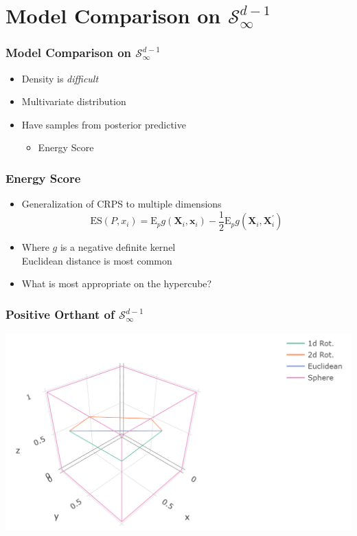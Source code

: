 \documentclass[aspectratio=169]{beamer}
\begin{document}
\section[Model Comparison]{Model Comparison on $\mathcal{S}_{\infty}^{d-1}$}

\begin{frame}
  \frametitle{Model Comparison on $\mathcal{S}_{\infty}^{d-1}$}
  \begin{itemize}
      \item Density is \emph{difficult}
      \item Multivariate distribution
      \item Have samples from posterior predictive
      \begin{itemize}
          \item Energy Score
      \end{itemize}
  \end{itemize}
\end{frame}

\begin{frame}
  \frametitle{Energy Score}
  \begin{itemize}
    \item Generalization of CRPS to multiple dimensions
    \begin{equation*}
      \label{eq:es}
      \text{ES}\left(P,x_i\right) =  \text{E}_p g\left(\bm{X}_i, \bm{x}_i\right)
                - \frac{1}{2}\text{E}_p g\left(\bm{X}_i,\bm{X}_i^{\prime}\right)
    \end{equation*}
    \pause
    \item Where $g$ is a negative definite kernel\\
      Euclidean distance is most common
    \pause
    \item What is most appropriate on the hypercube?
  \end{itemize}
\end{frame}

\begin{frame}
  \frametitle{Positive Orthant of $\mathcal{S}_{\infty}^{d-1}$}
  \begin{center}
    \includegraphics[width=0.8\linewidth]{./images/rotation}
  \end{center}
\end{frame}
\end{document}
